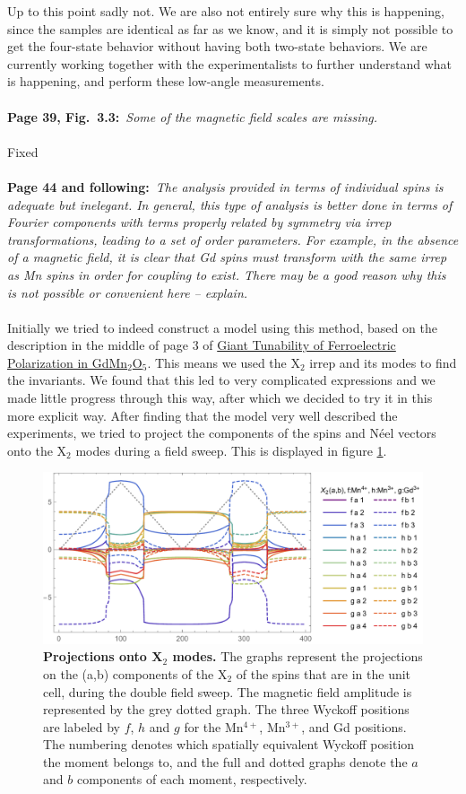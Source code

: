 \documentclass[a4, UTF8]{article}
\begin{document}
Up to this point sadly not. We are also not entirely sure why this is happening, since the samples are identical as far as we know, and it is simply not possible to get the four-state behavior without having both two-state behaviors. We are currently working together with the experimentalists to further understand what is happening, and perform these low-angle measurements.
\\\\
{\bf Page 39, Fig.~3.3:}~{\it Some of the magnetic field scales are missing.}
\\\\
Fixed
\\\\
{\bf Page 44 and following:}~{\it The analysis provided in terms of individual spins is adequate but
inelegant. In general, this type of analysis is better done in terms of Fourier components with
terms properly related by symmetry via irrep transformations, leading to a set of order parameters.
For example, in the absence of a magnetic field, it is clear that Gd spins must transform with the
same irrep as Mn spins in order for coupling to exist. There may be a good reason why this is not
possible or convenient here – explain.}
\\\\
Initially we tried to indeed construct a model using this method, based on the description in the middle of page 3 of \href{https://link.aps.org/doi/10.1103/PhysRevLett.110.137203}{Giant Tunability of Ferroelectric Polarization in GdMn$_2$O$_5$}. This means we used the X$_2$ irrep and its modes to find the invariants. We found that this led to very complicated expressions and we made little progress through this way, after which we decided to try it in this more explicit way.
After finding that the model very well described the experiments, we tried to project the components of the spins and N\'eel vectors onto the X$_2$ modes during a field sweep. This is displayed in figure \ref{allirreps}.
\begin{figure}[h]
	\includegraphics[width=\textwidth]{allIrreps.pdf}
	\caption{\label{allirreps}{\bf Projections onto X$_2$ modes.} The graphs represent the projections on the (a,b) components of the X$_2$ of the spins that are in the unit cell, during the double field sweep. The magnetic field amplitude is represented by the grey dotted graph. The three Wyckoff positions are labeled by $f$, $h$ and $g$ for the Mn$^{4+}$, Mn$^{3+}$, and Gd positions. The numbering denotes which spatially equivalent Wyckoff position the moment belongs to, and the full and dotted graphs denote the $a$ and $b$ components of each moment, respectively.}
\end{figure}
\end{document}
